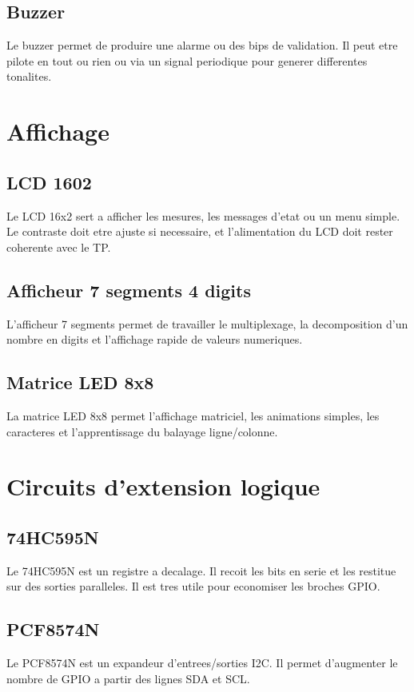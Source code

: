 \documentclass[11pt,a4paper]{article}
\begin{document}
\subsection{Buzzer}
Le buzzer permet de produire une alarme ou des bips de validation. Il peut etre pilote en tout ou rien ou via un signal periodique pour generer differentes tonalites.

\section{Affichage}
\subsection{LCD 1602}
Le LCD 16x2 sert a afficher les mesures, les messages d'etat ou un menu simple. Le contraste doit etre ajuste si necessaire, et l'alimentation du LCD doit rester coherente avec le TP.

\subsection{Afficheur 7 segments 4 digits}
L'afficheur 7 segments permet de travailler le multiplexage, la decomposition d'un nombre en digits et l'affichage rapide de valeurs numeriques.

\subsection{Matrice LED 8x8}
La matrice LED 8x8 permet l'affichage matriciel, les animations simples, les caracteres et l'apprentissage du balayage ligne/colonne.

\section{Circuits d'extension logique}
\subsection{74HC595N}
Le 74HC595N est un registre a decalage. Il recoit les bits en serie et les restitue sur des sorties paralleles. Il est tres utile pour economiser les broches GPIO.

\subsection{PCF8574N}
Le PCF8574N est un expandeur d'entrees/sorties I2C. Il permet d'augmenter le nombre de GPIO a partir des lignes SDA et SCL.
\end{document}
